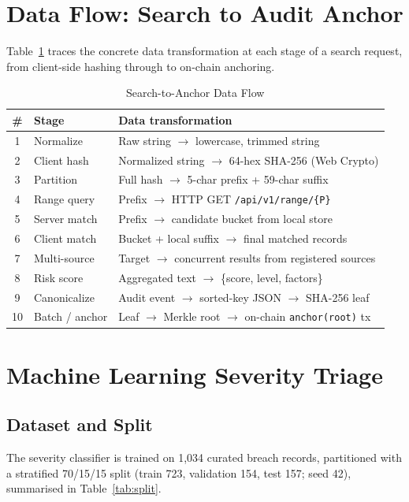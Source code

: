 \documentclass[conference]{IEEEtran}
\begin{document}
\section{Data Flow: Search to Audit Anchor}
Table~\ref{tab:dataflow} traces the concrete data transformation at each stage of a search request, from client-side hashing through to on-chain anchoring.

\begin{table}[htbp]
\caption{Search-to-Anchor Data Flow}
\label{tab:dataflow}
\centering
\scriptsize
\begin{tabular}{clp{5.4cm}}
\toprule
\textbf{\#} & \textbf{Stage} & \textbf{Data transformation} \\
\midrule
1 & Normalize & Raw string $\to$ lowercase, trimmed string \\
2 & Client hash & Normalized string $\to$ 64-hex SHA-256 (Web Crypto) \\
3 & Partition & Full hash $\to$ 5-char prefix + 59-char suffix \\
4 & Range query & Prefix $\to$ HTTP GET \texttt{/api/v1/range/\{P\}} \\
5 & Server match & Prefix $\to$ candidate bucket from local store \\
6 & Client match & Bucket + local suffix $\to$ final matched records \\
7 & Multi-source & Target $\to$ concurrent results from registered sources \\
8 & Risk score & Aggregated text $\to$ \{score, level, factors\} \\
9 & Canonicalize & Audit event $\to$ sorted-key JSON $\to$ SHA-256 leaf \\
10 & Batch / anchor & Leaf $\to$ Merkle root $\to$ on-chain \texttt{anchor(root)} tx \\
\bottomrule
\end{tabular}
\end{table}

\section{Machine Learning Severity Triage}
\label{sec:ml}

\subsection{Dataset and Split}
The severity classifier is trained on 1,034 curated breach records, partitioned with a stratified 70/15/15 split (train 723, validation 154, test 157; seed 42), summarised in Table~\ref{tab:split}.
\end{document}
